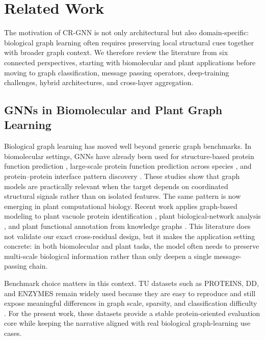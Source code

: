 \section{Related Work}
\label{sec:related}

The motivation of CR-GNN is not only architectural but also domain-specific: biological graph learning often requires preserving local structural cues together with broader graph context. We therefore review the literature from six connected perspectives, starting with biomolecular and plant applications before moving to graph classification, message passing operators, deep-training challenges, hybrid architectures, and cross-layer aggregation.

\subsection{GNNs in Biomolecular and Plant Graph Learning}

Biological graph learning has moved well beyond generic graph benchmarks. In biomolecular settings, GNNs have already been used for structure-based protein function prediction \cite{gligorijevic2021structure}, large-scale protein function prediction across species \cite{you2021deepgraphgo}, and protein--protein interface pattern discovery \cite{reau2022deeprankgnn}. These studies show that graph models are practically relevant when the target depends on coordinated structural signals rather than on isolated features. The same pattern is now emerging in plant computational biology. Recent work applies graph-based modeling to plant vacuole protein identification \cite{suiIdentificationPlantVacuole2023}, plant biological-network analysis \cite{charulekhaUncoveringComplicatedPlant}, and plant functional annotation from knowledge graphs \cite{baongoImprovingPlantFunctional2025}. This literature does not validate our exact cross-residual design, but it makes the application setting concrete: in both biomolecular and plant tasks, the model often needs to preserve multi-scale biological information rather than only deepen a single message-passing chain.

Benchmark choice matters in this context. TU datasets such as PROTEINS, DD, and ENZYMES remain widely used because they are easy to reproduce and still expose meaningful differences in graph scale, sparsity, and classification difficulty \cite{morris2020tudataset}. For the present work, these datasets provide a stable protein-oriented evaluation core while keeping the narrative aligned with real biological graph-learning use cases.

